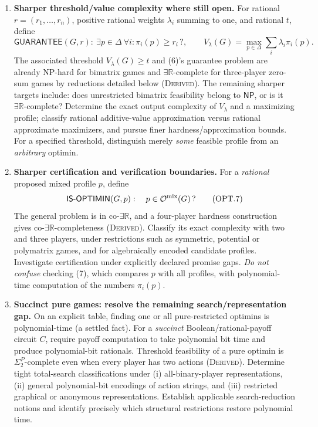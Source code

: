 \documentclass[11pt,a4paper]{article}
\providecommand{\ER}{\exists\mathbb R}
\providecommand{\coER}{\mathrm{co}\text{-}\exists\mathbb R}
\providecommand{\D}{\Delta}
\providecommand{\Opt}{\mathcal O}
\providecommand{\NP}{\mathsf{NP}}
\begin{document}
\begin{enumerate}[label=\textbf{(\Alph*)},leftmargin=2.8em,itemsep=11pt]
\item \textbf{Sharper threshold/value complexity where still open.}
For rational $r=(r_1,\ldots,r_n)$, positive rational weights $\lambda_i$ summing to one, and rational $t$, define
\[
 \mathsf{GUARANTEE}(G,r):\ \exists p\in\D\ \forall i:\pi_i(p)\ge r_i\,?,\qquad
 V_\lambda(G)=\max_{p\in\D}\sum_i\lambda_i\pi_i(p).
\tag{OPT.6}
\]
The associated threshold $V_\lambda(G)\ge t$ and (6)'s guarantee problem are already NP-hard for bimatrix games and $\ER$-complete for three-player zero-sum games by reductions detailed below (\textsc{Derived}). The remaining sharper targets include: does unrestricted bimatrix feasibility belong to $\NP$, or is it $\ER$-complete? Determine the exact output complexity of $V_\lambda$ and a maximizing profile; classify rational additive-value approximation versus rational approximate maximizers, and pursue finer hardness/approximation bounds. For a specified threshold, distinguish merely \emph{some} feasible profile from an \emph{arbitrary} optimin.

\item \textbf{Sharper certification and verification boundaries.}
For a \emph{rational} proposed mixed profile $p$, define
\[
 \mathsf{IS\text{-}OPTIMIN}(G,p):\quad p\in\Opt^{\rm mix}(G)\,?
\tag{OPT.7}
\]
The general problem is in $\coER$, and a four-player hardness construction gives $\coER$-completeness (\textsc{Derived}). Classify its exact complexity with two and three players, under restrictions such as symmetric, potential or polymatrix games, and for algebraically encoded candidate profiles. Investigate certification under explicitly declared promise gaps. \emph{Do not confuse} checking (7), which compares $p$ with all profiles, with polynomial-time computation of the numbers $\pi_i(p)$.

\item \textbf{Succinct pure games: resolve the remaining search/representation gap.}
On an explicit table, finding one or all pure-restricted optimins is polynomial-time (a settled fact). For a \emph{succinct} Boolean/rational-payoff circuit $C$, require payoff computation to take polynomial bit time and produce polynomial-bit rationals. Threshold feasibility of a pure optimin is $\Sigma_2^P$-complete even when every player has two actions (\textsc{Derived}). Determine tight total-search classifications under (i) all-binary-player representations, (ii) general polynomial-bit encodings of action strings, and (iii) restricted graphical or anonymous representations. Establish applicable search-reduction notions and identify precisely which structural restrictions restore polynomial time.


\end{enumerate}
\end{document}
